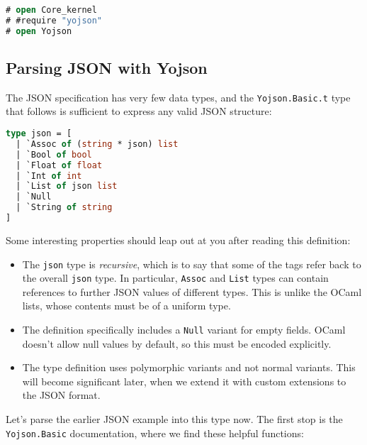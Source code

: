 \begin{lstlisting}[language=Caml]
# open Core_kernel
# #require "yojson"
# open Yojson
\end{lstlisting}

\hypertarget{parsing-json-with-yojson}{%
\subsection{Parsing JSON with Yojson}\label{parsing-json-with-yojson}}

The JSON specification has very few data types, and the
\passthrough{\lstinline!Yojson.Basic.t!} type that follows is sufficient
to express any valid JSON structure: 

\begin{lstlisting}[language=Caml]
type json = [
  | `Assoc of (string * json) list
  | `Bool of bool
  | `Float of float
  | `Int of int
  | `List of json list
  | `Null
  | `String of string
]
\end{lstlisting}

Some interesting properties should leap out at you after reading this
definition:

\begin{itemize}
\item
  The \passthrough{\lstinline!json!} type is \emph{recursive}, which is
  to say that some of the tags refer back to the overall
  \passthrough{\lstinline!json!} type. In particular,
  \passthrough{\lstinline!Assoc!} and \passthrough{\lstinline!List!}
  types can contain references to further JSON values of different
  types. This is unlike the OCaml lists, whose contents must be of a
  uniform type. 
\item
  The definition specifically includes a \passthrough{\lstinline!Null!}
  variant for empty fields. OCaml doesn't allow null values by default,
  so this must be encoded explicitly.
\item
  The type definition uses polymorphic variants and not normal variants.
  This will become significant later, when we extend it with custom
  extensions to the JSON format.
\end{itemize}

Let's parse the earlier JSON example into this type now. The first stop
is the \passthrough{\lstinline!Yojson.Basic!} documentation, where we
find these helpful functions:

